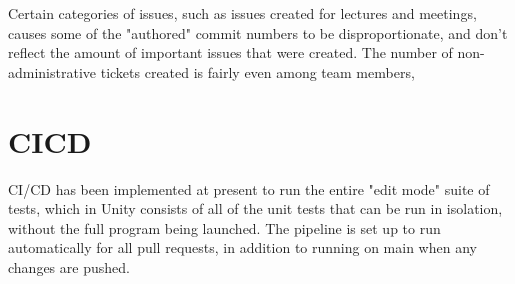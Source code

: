 \documentclass{article}
\begin{document}
Certain categories of issues, such as issues created for lectures and meetings, causes some of the "authored" commit numbers to be disproportionate, and don't reflect the amount of important issues that were created. The number of non-administrative tickets created is fairly even among team members, 

\section{CICD}

CI/CD has been implemented at present to run the entire "edit mode" suite of tests, which in Unity consists of all of the unit tests that can be run in isolation, without the full program being launched. The pipeline is set up to run automatically for all pull requests, in addition to running on main when any changes are pushed. 
\end{document}
